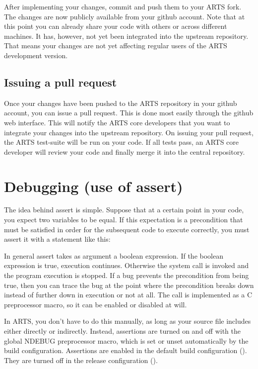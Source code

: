 After implementing your changes, commit and push them to your ARTS fork. The
changes are now publicly available from your github account. Note that at this
point you can already share your code with others or across different machines.
It has, however, not yet been integrated into the upstream repository. That
means your changes are not yet affecting regular users of the ARTS development
version.

\subsection{Issuing a pull request}

Once your changes have been pushed to the ARTS repository in your github
account, you can issue a pull request. This is done most easily through the
github web interface. This will notify the ARTS core developers that you want to
integrate your changes into the upstream repository. On issuing your pull
request, the ARTS test-suite will be run on your code. If all tests pass, an
ARTS core developer will review your code and finally merge it into the central
repository.

\section{Debugging (use of assert)}
\label{sec:development:assert}
 
The idea behind assert is simple. Suppose that at a certain point in
your code, you expect two variables to be equal.  If this expectation
is a precondition that must be satisfied in order for the subsequent
code to execute correctly, you must assert it with a statement like
this:
\begin{quote}
\end{quote}

In general assert takes as argument a boolean expression. If the
boolean expression is true, execution continues. Otherwise the
 system call is invoked and the program execution is
stopped. If a bug prevents the precondition from being true, then you
can trace the bug at the point where the precondition breaks down
instead of further down in execution or not at all.  The  call
is implemented as a C preprocessor macro, so it can be enabled or
disabled at will. 

In ARTS, you don't have to do this manually, as long as your source file
includes  either directly or indirectly. Instead, assertions
are turned on and off with the global NDEBUG preprocessor macro, which is
set or unset automatically by the  build configuration.
Assertions are enabled in the default  build configuration
(). They are turned off in the
release configuration ().


